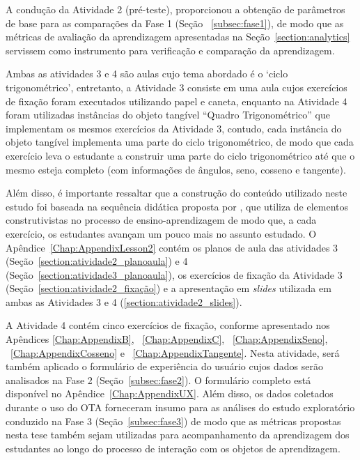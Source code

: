 A condução da Atividade 2 (pré-teste), proporcionou a obtenção de parâmetros de base para as comparações da Fase 1 (Seção ~\ref{subsec:fase1}), de modo que as métricas de avaliação da aprendizagem apresentadas na Seção~\ref{section:analytics} servissem como instrumento para verificação e comparação da aprendizagem.

Ambas as atividades 3 e 4 são aulas cujo tema abordado é o `ciclo trigonométrico', entretanto, a Atividade 3 consiste em uma aula cujos exercícios de fixação foram executados utilizando papel e caneta, enquanto na Atividade 4 foram utilizadas instâncias do objeto tangível ``Quadro Trigonométrico'' que implementam os mesmos exercícios da Atividade 3, contudo, cada instância do objeto tangível implementa uma parte do ciclo trigonométrico, de modo que cada exercício leva o estudante a construir uma parte do ciclo trigonométrico até que o mesmo esteja completo (com informações de ângulos, seno, cosseno e tangente).

Além disso, é importante ressaltar que a construção do conteúdo utilizado neste estudo foi baseada na sequência didática proposta por \cite{silva:2011}, que utiliza de elementos construtivistas no processo de ensino-aprendizagem de modo que, a cada exercício, os estudantes avançam um pouco mais no assunto estudado. O Apêndice~\ref{Chap:AppendixLesson2} contém os planos de aula das atividades 3 (Seção~\ref{section:atividade2_planoaula}) e 4 (Seção~\ref{section:atividade3_planoaula}), os exercícios de fixação da Atividade 3 (Seção~\ref{section:atividade2_fixação}) e a apresentação em \textit{slides} utilizada em ambas as Atividades 3 e 4 (\ref{section:atividade2_slides}).

A Atividade 4 contém cinco exercícios de fixação, conforme apresentado nos Apêndices \ref{Chap:AppendixB}, ~\ref{Chap:AppendixC}, ~\ref{Chap:AppendixSeno}, ~\ref{Chap:AppendixCosseno} e ~\ref{Chap:AppendixTangente}. Nesta atividade, será também aplicado o formulário de experiência do usuário cujos dados serão analisados na Fase 2 (Seção~\ref{subsec:fase2}). O formulário completo está disponível no Apêndice~\ref{Chap:AppendixUX}. Além disso, os dados coletados durante o uso do OTA forneceram insumo para as análises do estudo exploratório conduzido na Fase 3 (Seção~\ref{subsec:fase3}) de modo que as métricas propostas nesta tese também sejam utilizadas para acompanhamento da aprendizagem dos estudantes ao longo do processo de interação com os objetos de aprendizagem.

